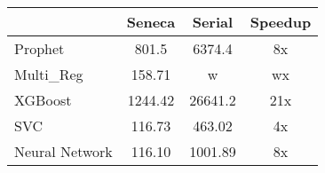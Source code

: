 \begin{tabular}{|l|c|c|c|}
\hline
& Seneca & Serial & Speedup \\
\hline
Prophet & 801.5 & 6374.4 & 8x\\
\hline
Multi\_Reg & 158.71 & w & wx \\
\hline
XGBoost & 1244.42 & 26641.2 & 21x\\
\hline
SVC & 116.73 & 463.02 & 4x\\
\hline
Neural Network & 116.10 & 1001.89 & 8x\\
\hline
\end{tabular}

